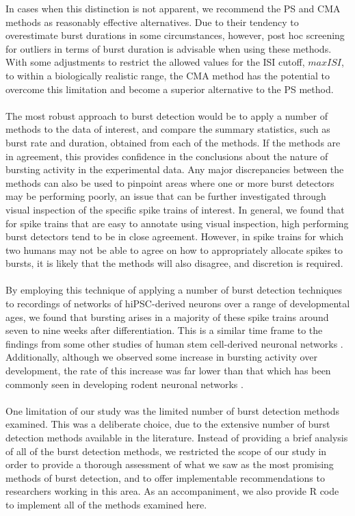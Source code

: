 \documentclass[12pt, titlepage]{article}
\begin{document}
	In cases when this distinction is not apparent, we recommend the PS and CMA methods as reasonably effective alternatives. Due to their tendency to overestimate burst durations in some circumstances, however, post hoc screening for outliers in terms of burst duration is advisable when using these methods. With some adjustments to restrict the allowed values for the ISI cutoff, $maxISI$, to within a biologically realistic range, the CMA method has the potential to overcome this limitation and become a superior alternative to the PS method.
	\\ \\The most robust approach to burst detection would be to apply a number of methods to the data of interest, and compare the summary statistics, such as burst rate and duration, obtained from each of the methods. %
	If the methods are in agreement, this provides confidence in the conclusions about the nature of bursting activity in the experimental data. Any major discrepancies between the methods can also be used to pinpoint areas where one or more burst detectors may be performing poorly, an issue that can be further investigated through visual inspection of the specific spike trains of interest. In general, we found that for spike trains that are easy to annotate using visual inspection, high performing burst detectors tend to be in close agreement. However, in spike trains for which two humans may not be able to agree on how to appropriately allocate spikes to bursts, it is likely that the methods will also disagree, and discretion is required.
	\\ \\By employing this technique of applying a number of burst detection techniques to recordings of networks of hiPSC-derived neurons over a range of developmental ages, we found that bursting arises in a majority of these spike trains around seven to nine weeks after differentiation.  This is a similar time frame to the findings from some other studies of human stem cell-derived neuronal networks \cite{Heikkila2009,Kirwan2015}. Additionally, although we observed some increase in bursting activity over development, the rate of this increase was far lower than that which has been commonly seen in developing rodent neuronal networks \cite{Chiappalone2005,Charlesworth2015,Demas2003}.
	\\ \\One limitation of our study was the limited number of burst detection methods examined. This was a deliberate choice, due to the extensive number of burst detection methods available in the literature. Instead of providing a brief analysis of all of the burst detection methods, we restricted the scope of our study in order to provide a thorough assessment of what we saw as the most promising methods of burst detection, and to offer implementable recommendations to researchers working in this area. As an accompaniment, we also provide R code to implement all of the methods examined here.
\end{document}
